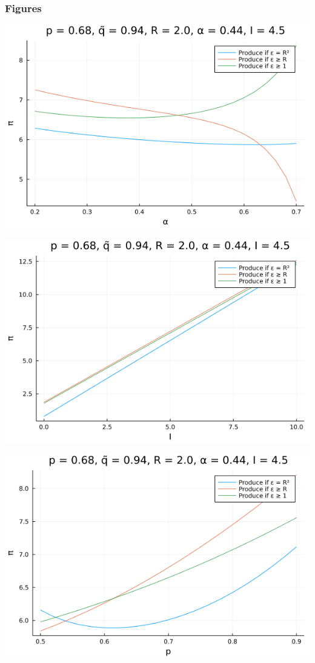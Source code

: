 \documentclass{article}
\begin{document}
\subsubsection*{Figures}

\begin{center}

\includegraphics[scale = 0.5]{plot_alpha.png}

\includegraphics[scale = 0.5]{plot_I.png}

\includegraphics[scale = 0.5]{plot_p.png}


\end{center}
\end{document}

